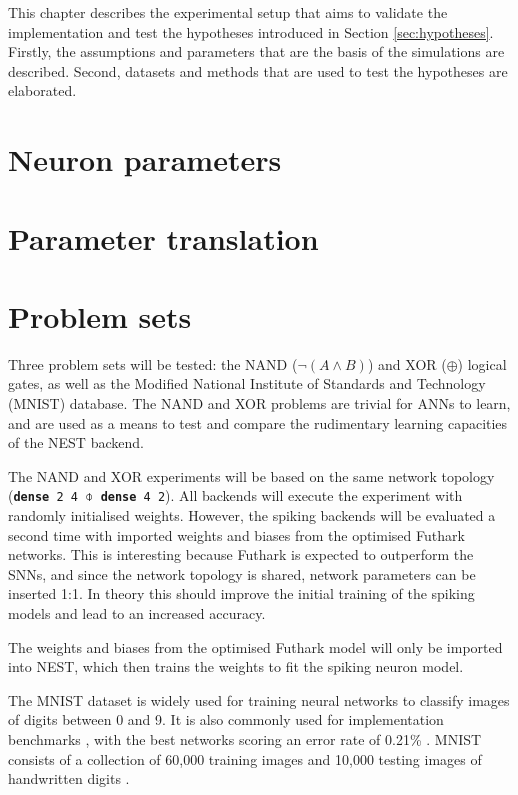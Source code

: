 \documentclass[report.tex]{subfiles}
\begin{document}
This chapter describes the experimental setup that aims to validate the
implementation and test the hypotheses introduced in Section \ref{sec:hypotheses}.
Firstly, the assumptions and parameters that are the basis of the simulations are described.
Second, datasets and methods that are used to test the hypotheses are
elaborated.

\section{Neuron parameters}


\section{Parameter translation} \label{sec:translation}


\section{Problem sets}
Three problem sets will be tested: the NAND ($\neg(A \land B)$) and XOR
($\oplus$) logical gates, as well as the 
Modified National Institute of Standards and Technology
(MNIST) database.
The NAND and XOR problems are trivial for \glspl{ANN} to learn, and are used as
a means to test and compare the rudimentary learning capacities of the NEST
backend.

The NAND and XOR experiments will be based on the same network topology
(\texttt{\textbf{dense} 2 4 $\obar$ \textbf{dense} 4 2}). 
All backends will execute the experiment with randomly initialised weights. However, the spiking backends will be evaluated
a second time with imported weights and biases from the optimised Futhark
networks.
This is interesting because Futhark is expected to outperform the \glspl{SNN}, and since the
network topology is shared, network parameters can be inserted 1:1.
In theory this should improve the initial training of the spiking models and
lead to an increased accuracy.

The weights and biases from the optimised Futhark model will only be imported into NEST,
which then trains the weights to fit the spiking neuron model.

The MNIST dataset is widely used for training neural networks to classify
images of digits between 0 and 9. 
It is also commonly used for implementation benchmarks \cite{Schmidhuber2014,
Schmitt2017}, with the best networks scoring an error rate of 0.21\%
\cite{LeCun2019}.
MNIST consists of a collection of 60,000 training images and 10,000 testing images of handwritten digits \cite{LeCun1998}.
\end{document}
